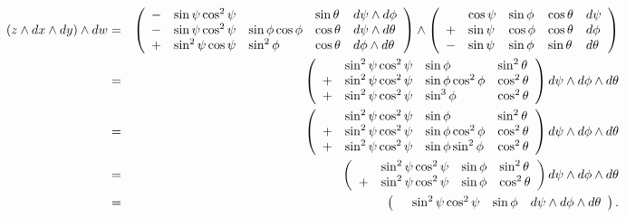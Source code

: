 \documentclass[10pt]{article}
\numberwithin{equation}{subsection}
\begin{document}
\begin{eqnarray*}
	\left(z \wedge dx \wedge dy\right) \wedge dw
	&=& \plmatrix{
			-&\sin\psi\cos^2\psi &                  &\sin\theta &d\psi \wedge d\phi \\
			-&\sin\psi\cos^2\psi & \sin\phi\cos\phi &\cos\theta &d\psi\wedge d\theta \\
			+&\sin^2\psi\cos\psi & \sin^2\phi       &\cos\theta &d\phi\wedge d\theta
		}
	\wedge
	\plmatrix{
		&  \cos\psi &\sin\phi &\cos\theta &d\psi \\
		+& \sin\psi &\cos\phi &\cos\theta &d\phi \\
		-& \sin\psi &\sin\phi &\sin\theta &d\theta
	} \\
%
	&=& \plmatrix{
		& \sin^2\psi\cos^2\psi &\sin\phi           &\sin^2\theta \\
		+&\sin^2\psi\cos^2\psi &\sin\phi\cos^2\phi &\cos^2\theta \\
		+&\sin^2\psi\cos^2\psi &\sin^3\phi         &\cos^2\theta
		}
		d\psi\wedge d\phi \wedge d\theta \\
%
	&=& \plmatrix{
		&  \sin^2\psi\cos^2\psi &\sin\phi           &\sin^2\theta \\
		+& \sin^2\psi\cos^2\psi &\sin\phi\cos^2\phi &\cos^2\theta \\
		+& \sin^2\psi\cos^2\psi &\sin\phi\sin^2\phi &\cos^2\theta
		}
		d\psi\wedge d\phi \wedge d\theta \\
%
	&=& \plmatrix{
		& \sin^2\psi\cos^2\psi &\sin\phi &\sin^2\theta \\
		+&\sin^2\psi\cos^2\psi &\sin\phi &\cos^2\theta
		}
		d\psi \wedge d\phi \wedge d\theta \\
%
	&=& \plmatrix{
		&\sin^2\psi\cos^2\psi &\sin\phi &d\psi \wedge d\phi \wedge d\theta
		}.
\end{eqnarray*}
\end{document}

